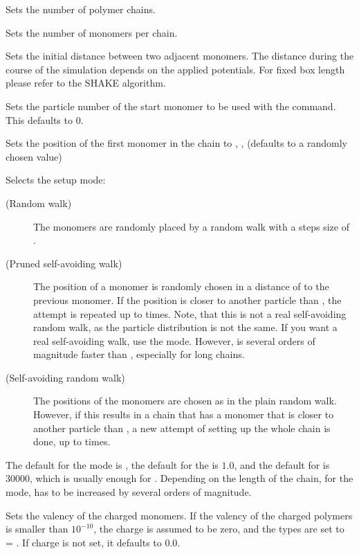 \begin{arguments}
\item[\var{num_polymers}] Sets the number of polymer chains.
\item[\var{monomers_per_chain}] Sets the number of monomers per
  chain.
\item[\var{bond_length}] Sets the initial distance between two adjacent
  monomers. The distance during the course of the simulation depends on the
  applied potentials. For fixed box length please refer to the SHAKE algorithm.
\item[\opt{start \var{part_id}}] Sets the particle number of the
  start monomer to be used with the  command. This
  defaults to 0.

\item[\opt{pos \var{x} \var{y} \var{z}}] Sets the position of the
  first monomer in the chain to , ,  (defaults to
  a randomly chosen value)
  
\item[\opt{mode \alt{RW  \asep  PSAW  \asep  SAW} \opt{\var{shield}
      \opt{\var{max_try}}}}]
  Selects the setup mode:
  \begin{description}
  \item[ (Random walk)] The monomers are
    randomly placed by a random walk with a steps size of
    .
  \item[ (Pruned self-avoiding walk)] The position of a
    monomer is randomly chosen in a distance of  to
    the previous monomer. If the position is closer to another
    particle than , the attempt is repeated up to
     times. Note, that this is not a real self-avoiding
    random walk, as the particle distribution is not the same. If you
    want a real self-avoiding walk, use the  mode.
    However,  is several orders of magnitude faster than
    , especially for long chains.
  \item[ (Self-avoiding random walk)] The positions of
    the monomers are chosen as in the plain random walk. However, if
    this results in a chain that has a monomer that is closer to
    another particle than , a new attempt of setting up
    the whole chain is done, up to  times.
  \end{description}
  The default for the mode is , the default for the
   is $1.0$, and the default for  is
  $30000$, which is usually enough for . Depending on
  the length of the chain, for the  mode, 
  has to be increased by several orders of magnitude.
\item[\opt{charge \var{val_charged_monomer}}] Sets the valency of
  the charged monomers.  If the valency of the charged polymers
   is smaller than $10^{-10}$, the charge
  is assumed to be zero, and the types are set to
   = . If charge is not set,
  it defaults to 0.0.


\end{arguments}
